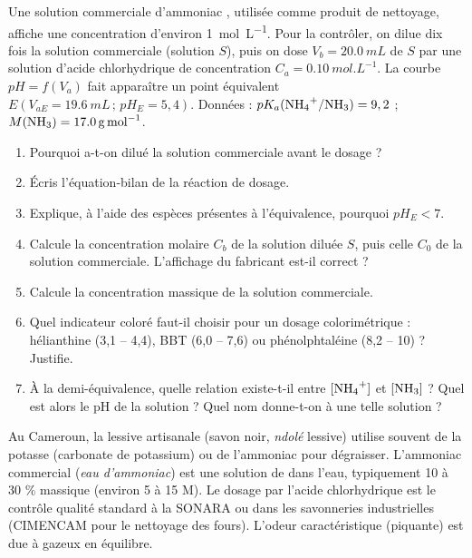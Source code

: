 \documentclass[11pt]{article}
\begin{document}
\begin{exercice}
Une solution commerciale d'ammoniac , utilisée comme produit de nettoyage, affiche une concentration d'environ \SI{1}{mol.L^{-1}}. Pour la contrôler, on dilue dix fois la solution commerciale (solution $S$), puis on dose $V_b = \SI{20,0}{mL}$ de $S$ par une solution d'acide chlorhydrique de concentration $C_a = \SI{0,10}{mol.L^{-1}}$. La courbe $pH = f(V_a)$ fait apparaître un point équivalent $E(V_{aE} = \SI{19,6}{mL}\,;\, pH_E = 5,4)$. Données : $pK_a(\ce{NH4+}/\ce{NH3}) = 9,2$ ; $M(\ce{NH3}) = \SI{17,0}{g.mol^{-1}}$.

\begin{enumerate}
\item Pourquoi a-t-on dilué la solution commerciale avant le dosage ?
\item Écris l'équation-bilan de la réaction de dosage.
\item Explique, à l'aide des espèces présentes à l'équivalence, pourquoi $pH_E < 7$.
\item Calcule la concentration molaire $C_b$ de la solution diluée $S$, puis celle $C_0$ de la solution commerciale. L'affichage du fabricant est-il correct ?
\item Calcule la concentration massique de la solution commerciale.
\item Quel indicateur coloré faut-il choisir pour un dosage colorimétrique : hélianthine (3,1 -- 4,4), BBT (6,0 -- 7,6) ou phénolphtaléine (8,2 -- 10) ? Justifie.
\item À la demi-équivalence, quelle relation existe-t-il entre $[\ce{NH4+}]$ et $[\ce{NH3}]$ ? Quel est alors le pH de la solution ? Quel nom donne-t-on à une telle solution ?
\end{enumerate}
\end{exercice}

\begin{savaistu}
Au Cameroun, la lessive artisanale (savon noir, \emph{ndolé} lessive) utilise souvent de la potasse (carbonate de potassium) ou de l'ammoniac pour dégraisser. L'ammoniac commercial (\emph{eau d'ammoniac}) est une solution de  dans l'eau, typiquement 10 à 30 \% massique (environ 5 à 15 M). Le dosage par l'acide chlorhydrique est le contrôle qualité standard à la SONARA ou dans les savonneries industrielles (CIMENCAM pour le nettoyage des fours). L'odeur caractéristique (piquante) est due à  gazeux en équilibre.
\end{savaistu}
\end{document}
